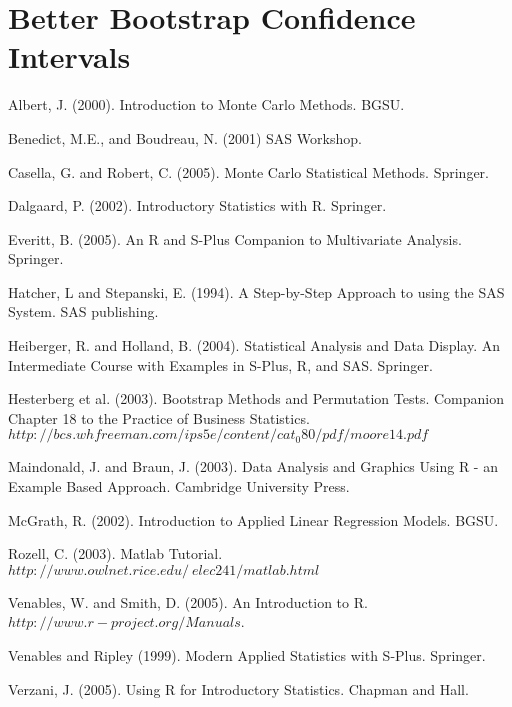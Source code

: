 \documentclass[captions=tableheading]{scrbook}
\begin{document}
\section{Better Bootstrap Confidence Intervals}
\label{sec-5_5}







\begin{thebibliography}{14}
Albert, J. (2000). Introduction to Monte Carlo Methods.
BGSU.

Benedict, M.E., and Boudreau, N. (2001) SAS\textregistered{}
Workshop.

Casella, G. and Robert, C. (2005). Monte Carlo Statistical
Methods. Springer.

Dalgaard, P. (2002). Introductory Statistics with R.
Springer.

Everitt, B. (2005). An R and S-Plus Companion to Multivariate
Analysis. Springer.

Hatcher, L and Stepanski, E. (1994). A Step-by-Step
Approach to using the SAS System. SAS publishing.

Heiberger, R. and Holland, B. (2004). Statistical
Analysis and Data Display. An Intermediate Course with Examples in
S-Plus, R, and SAS. Springer.

Hesterberg et al. (2003). Bootstrap Methods and Permutation
Tests. Companion Chapter 18 to the Practice of Business Statistics.
$http://bcs.whfreeman.com/ips5e/content/cat_{0}80/pdf/moore14.pdf$

Maindonald, J. and Braun, J. (2003). Data Analysis
and Graphics Using R - an Example Based Approach. Cambridge University
Press.

McGrath, R. (2002). Introduction to Applied Linear Regression Models. BGSU.

Rozell, C. (2003). Matlab Tutorial. $http://www.owlnet.rice.edu/~elec241/matlab.html$

Venables, W. and Smith, D. (2005). An Introduction
to R. $http://www.r-project.org/Manuals$.

Venables and Ripley (1999). Modern Applied Statistics
with S-Plus. Springer.

Verzani, J. (2005). Using R for Introductory Statistics.
Chapman and Hall. 
\end{thebibliography}
\end{document}
